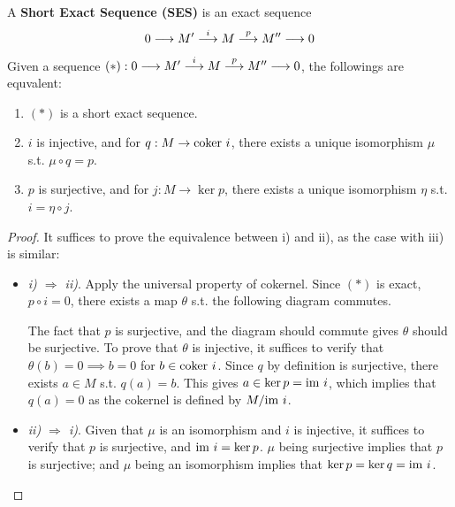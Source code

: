 \documentclass{article}
\begin{document}
\begin{definition}
    A \textbf{Short Exact Sequence (SES)} is an exact sequence
    \[
        0 \longrightarrow M' \overset{i}{\longrightarrow} M \overset{p}{\longrightarrow} M'' \longrightarrow 0
    \]
\end{definition}

\begin{proposition}
    Given a sequence $(\ast): 0 \longrightarrow M' \overset{i}{\longrightarrow} M \overset{p}{\longrightarrow} M'' \longrightarrow 0$, the followings are equvalent:
    \begin{enumerate}[label=\roman*)]
        \item $(\ast)$ is a short exact sequence.
        \item $i$ is injective, and for $q: M \to \mathrm{coker}\  i$, there exists a unique isomorphism $\mu$ s.t. $\mu \circ q = p$.
        \item $p$ is surjective, and for $j: M \to \ker p$, there exists a unique isomorphism $\eta$ s.t. $i = \eta \circ j$.
    \end{enumerate}
\end{proposition}

\begin{proof}
    It suffices to prove the equivalence between i) and ii), as the case with iii) is similar:
    \begin{itemize}
        \item \emph{i) $\Rightarrow$ ii)}. Apply the universal property of cokernel. Since $(\ast)$ is exact, $p \circ i = 0$, there exists a map $\theta$ s.t. the following diagram commutes.
        \begin{figure}[htbp]
            \centering
        \end{figure}
        The fact that $p$ is surjective, and the diagram should commute gives $\theta$ should be surjective. To prove that $\theta$ is injective, it suffices to verify that $\theta(b) = 0 \implies b = 0$ for $b \in \mathrm{coker}\  i$. Since $q$ by definition is surjective, there exists $a \in M$ s.t. $q(a) = b$. This gives $a \in \ker p = \mathrm{im}\  i$, which implies that $q(a) = 0$ as the cokernel is defined by $M/ \mathrm{im}\  i$.
        \item \emph{ii) $\Rightarrow$ i)}. Given that $\mu$ is an isomorphism and $i$ is injective, it suffices to verify that $p$ is surjective, and $\mathrm{im}\  i = \ker p$. $\mu$ being surjective implies that $p$ is surjective; and $\mu$ being an isomorphism implies that $\ker p = \ker q = \mathrm{im}\  i$. 
    \end{itemize}
\end{proof}
\end{document}
